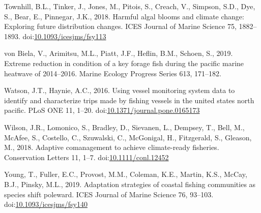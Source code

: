\documentclass[]{elsarticle} %
\begin{document}
\leavevmode\hypertarget{ref-Townhill2018}{}%
Townhill, B.L., Tinker, J., Jones, M., Pitois, S., Creach, V., Simpson,
S.D., Dye, S., Bear, E., Pinnegar, J.K., 2018. Harmful algal blooms and
climate change: Exploring future distribution changes. ICES Journal of
Marine Science 75, 1882--1893.
doi:\href{https://doi.org/10.1093/icesjms/fsy113}{10.1093/icesjms/fsy113}

\leavevmode\hypertarget{ref-VonBiela2019}{}%
von Biela, V., Arimitsu, M.L., Piatt, J.F., Heflin, B.M., Schoen, S.,
2019. Extreme reduction in condition of a key forage fish during the
pacific marine heatwave of 2014--2016. Marine Ecology Progress Series
613, 171--182.

\leavevmode\hypertarget{ref-Watson2016a}{}%
Watson, J.T., Haynie, A.C., 2016. Using vessel monitoring system data to
identify and characterize trips made by fishing vessels in the united
states north pacific. PLoS ONE 11, 1--20.
doi:\href{https://doi.org/10.1371/journal.pone.0165173}{10.1371/journal.pone.0165173}

\leavevmode\hypertarget{ref-Wilson2018}{}%
Wilson, J.R., Lomonico, S., Bradley, D., Sievanen, L., Dempsey, T.,
Bell, M., McAfee, S., Costello, C., Szuwalski, C., McGonigal, H.,
Fitzgerald, S., Gleason, M., 2018. Adaptive comanagement to achieve
climate-ready fisheries. Conservation Letters 11, 1--7.
doi:\href{https://doi.org/10.1111/conl.12452}{10.1111/conl.12452}

\leavevmode\hypertarget{ref-Young2019}{}%
Young, T., Fuller, E.C., Provost, M.M., Coleman, K.E., Martin, K.S.,
McCay, B.J., Pinsky, M.L., 2019. Adaptation strategies of coastal
fishing communities as species shift poleward. ICES Journal of Marine
Science 76, 93--103.
doi:\href{https://doi.org/10.1093/icesjms/fsy140}{10.1093/icesjms/fsy140}
\end{document}
